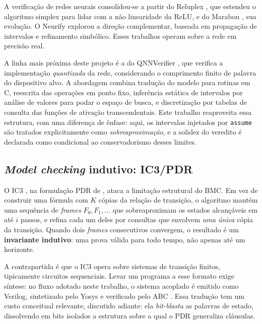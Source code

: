 A verificação de redes neurais consolidou-se a partir do Reluplex \cite{katz2017reluplex}, que
estendeu o algoritmo simplex para lidar com a não linearidade da ReLU, e do Marabou
\cite{katz2019marabou}, sua evolução. O Neurify \cite{wang2018neurify} explorou a direção
complementar, baseada em propagação de intervalos e refinamento simbólico. Esses trabalhos
operam sobre a rede em precisão real.

A linha mais próxima deste projeto é a do QNNVerifier \cite{sena2021qnn,
song2021qnnverifier}, que verifica a implementação \emph{quantizada} da rede, considerando o
comprimento finito de palavra do dispositivo alvo. A abordagem combina tradução do modelo para
rotinas em C, reescrita das operações em ponto fixo, inferência estática de intervalos por
análise de valores para podar o espaço de busca, e discretização por tabelas de consulta das
funções de ativação transcendentais. Este trabalho reaproveita essa estrutura, com uma
diferença de ênfase: aqui, os intervalos injetados por \texttt{assume} são tratados
explicitamente como \emph{sobreaproximação}, e a solidez do veredito é declarada como
condicional ao conservadorismo desses limites.

\subsection{\textit{Model checking} indutivo: IC3/PDR}

O IC3 \cite{bradley2011ic3}, na formulação PDR de , ataca a limitação
estrutural do BMC. Em vez de construir uma fórmula com $K$ cópias da relação de transição, o
algoritmo mantém uma sequência de \textit{frames} $F_0, F_1, \dots$ que sobreaproximam os
estados alcançáveis em até $i$ passos, e refina cada um deles por consultas que envolvem
\emph{uma única} cópia da transição. Quando dois \textit{frames} consecutivos convergem, o
resultado é um \textbf{invariante indutivo}: uma prova válida para todo tempo, não apenas até
um horizonte.

A contrapartida é que o IC3 opera sobre sistemas de transição finitos, tipicamente circuitos
sequenciais. Levar um programa a esse formato exige síntese: no fluxo adotado neste trabalho,
o sistema acoplado é emitido como Verilog, sintetizado pelo Yosys \cite{wolf2016yosys} e
verificado pelo ABC \cite{brayton2010abc}. Essa tradução tem um custo conceitual relevante,
discutido adiante: ela \emph{bit-blasta} as palavras de estado, dissolvendo em bits isolados a
estrutura sobre a qual o PDR generaliza cláusulas.
